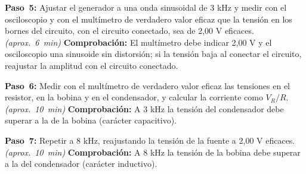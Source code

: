 \documentclass[12pt]{article}
\begin{document}
\begin{pasos}
  \item \textbf{Paso~5:} Ajustar el generador a una onda sinusoidal de 3 kHz y medir con el osciloscopio y con el multímetro de verdadero valor eficaz que la tensión en los bornes del circuito, con el circuito conectado, sea de 2,00 V eficaces. \emph{(aprox.~\SI{6}{\minute})} \textbf{Comprobación:} El multímetro debe indicar 2,00 V y el osciloscopio una sinusoide sin distorsión; si la tensión baja al conectar el circuito, reajustar la amplitud con el circuito conectado.
  \item \textbf{Paso~6:} Medir con el multímetro de verdadero valor eficaz las tensiones en el resistor, en la bobina y en el condensador, y calcular la corriente como $V_R/R$. \emph{(aprox.~\SI{10}{\minute})} \textbf{Comprobación:} A 3 kHz la tensión del condensador debe superar a la de la bobina (carácter capacitivo).
  \item \textbf{Paso~7:} Repetir a 8 kHz, reajustando la tensión de la fuente a 2,00 V eficaces. \emph{(aprox.~\SI{10}{\minute})} \textbf{Comprobación:} A 8 kHz la tensión de la bobina debe superar a la del condensador (carácter inductivo).
\end{pasos}
\end{document}
